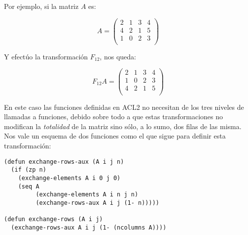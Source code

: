 \documentclass[a4paper,10pt]{article}
\begin{document}
\par \vspace{10pt}

Por ejemplo, si la matriz $A$ es:

\par \vspace{10pt}

$$
A=
\begin{pmatrix}
2 & 1 & 3 & 4 \\
4 & 2 & 1 & 5 \\
1 & 0 & 2 & 3 \\ 
\end{pmatrix}
$$ 

\par \vspace{10pt}

Y efectúo la transformación $F_{12}$, nos queda:

\par \vspace{10pt}

$$
F_{12}A=
\begin{pmatrix}
2 & 1 & 3 & 4 \\
1 & 0 & 2 & 3 \\ 
4 & 2 & 1 & 5 \\
\end{pmatrix}
$$ 

\par \vspace{10pt}

En este caso las funciones definidas en ACL2 no necesitan de los tres niveles de llamadas a funciones, debido sobre todo a que estas transformaciones no modifican la \emph{totalidad} de la matriz sino sólo, a lo sumo, dos filas de las misma. Nos vale un esquema de dos funciones como el que sigue para definir esta transformación:

\par \vspace{10pt}

\begin{lstlisting}[language=clips]
(defun exchange-rows-aux (A i j n)
  (if (zp n)
    (exchange-elements A i 0 j 0)
    (seq A
         (exchange-elements A i n j n)
         (exchange-rows-aux A i j (1- n)))))
       
(defun exchange-rows (A i j)
  (exchange-rows-aux A i j (1- (ncolumns A))))
\end{lstlisting}

\par \vspace{10pt}
\end{document}
